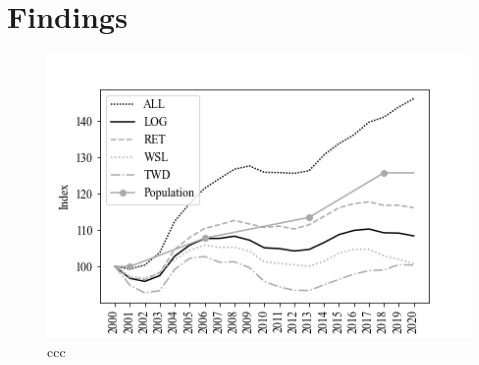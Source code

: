 \documentclass[3p, a4paper, authoryear, 11pt, fleqn, review]{elsarticle}
\newcommand{\nmt}[1]{{\color{ForestGreen}{~(nmt: #1)}}}
\begin{document}


\section{Findings}
\label{sec:Findings}


\begin{figure}[h!]
    \centering
    \includegraphics[width=0.9\linewidth]{IndexedGrowth.png}
    \caption{ccc}
    \label{fig:growth}
\end{figure}
\end{document}
